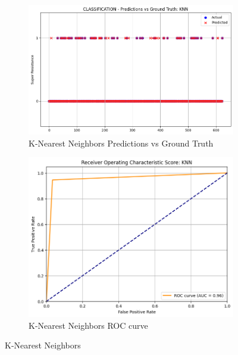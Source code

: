 \documentclass[manuscript,screen,review, nonacm]{acmart}
\begin{document}
  \begin{figure}[H]
      \centering
      \begin{subfigure}{0.45\textwidth}
          \includegraphics[width=\linewidth]{figs/KNN1.png}
          \caption{K-Nearest Neighbors Predictions vs Ground Truth}

      \end{subfigure}
      \hfill
      \begin{subfigure}{0.45\textwidth}
          \includegraphics[width=\linewidth]{figs/knn2.png}
          \caption{K-Nearest Neighbors ROC curve}

      \end{subfigure}
      \caption{K-Nearest Neighbors}

  \end{figure}
\end{document}

